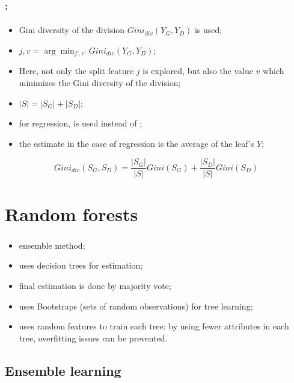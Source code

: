 \documentclass[xcolor=table]{beamer}
\begin{document}
\begin{frame}
	\frametitle{\insertshortsubtitle: \insertsection}
	\framesubtitle{\insertsubsection}
	
	\begin{itemize}
		\item Gini diversity of the division $Gini_{div}(Y_G, Y_D)$ is used;
		\item $j, v = \arg\min_{j', v'} Gini_{div}(Y_G, Y_D)$;
		\item Here, not only the split feature $j$ is explored, but also the value $v$ which minimizes the Gini diversity of the division;
		\item $|S| = |S_G| + |S_D|$;
		\item for regression,  is used instead of ;
		\item the estimate in the case of regression is the average of the leaf's $Y$;
	\end{itemize}
	
	\[Gini_{div}(S_G, S_D) = \frac{|S_G|}{|S|} Gini(S_G) + \frac{|S_D|}{|S|} Gini(S_D)\]
	
	
\end{frame}

\section{Random forests}

\begin{frame}
	\frametitle{\insertshortsubtitle}
	\framesubtitle{\insertsection}
	\begin{itemize}
		\item ensemble method;
		\item uses decision trees for estimation;
		\item final estimation is done by majority vote;
		\item uses Bootstraps (sets of random observations) for tree learning;
		\item uses random features to train each tree: by using fewer attributes in each tree, overfitting issues can be prevented.
	\end{itemize}
	
\end{frame}

\subsection{Ensemble learning}
\end{document}
